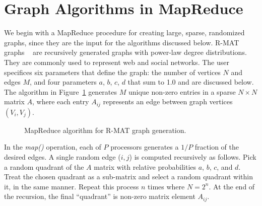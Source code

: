 \section{Graph Algorithms in MapReduce}
\label{sec:graph}

We begin with a MapReduce procedure for creating large, sparse,
randomized graphs, since they are the input for the algorithms
discussed below.  R-MAT graphs ~\cite{RMAT} are recursively generated
graphs with power-law degree distributions.  They are commonly used to
represent web and social networks.  The user specifices six parameters
that define the graph: the number of vertices $N$ and edges $M$, and
four parameters $a$, $b$, $c$, $d$ that sum to 1.0 and are discussed
below.  The algorithm in Figure~\ref{fig:rmat} generates $M$ unique
non-zero entries in a sparse $N \times N$ matrix $A$, where each entry
$A_{ij}$ represents an edge between graph vertices $(V_i,V_j)$.

\begin{figure}[htb]
 \begin{center}\end{center}

 \caption{MapReduce algorithm for R-MAT graph generation.}

 \label{fig:rmat}
\end{figure}

In the {\it map()} operation, each of $P$ processors generates a $1/P$
fraction of the desired edges.  A single random edge ($i,j$) is computed
recursively as follows.  Pick a random quadrant of the $A$ matrix with
relative probabilities $a$, $b$, $c$, and $d$.  Treat the chosen
quadrant as a sub-matrix and select a random quadrant within it, in
the same manner.  Repeat this process $n$ times where $N = 2^n$.  At
the end of the recursion, the final ``quadrant'' is non-zero matrix
element $A_{ij}$.

